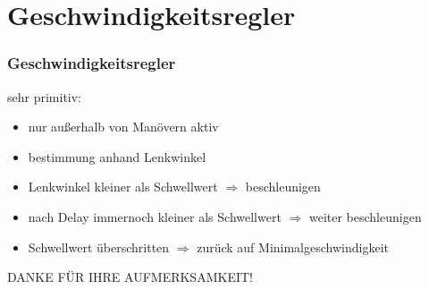 \documentclass{beamer}
\begin{document}
	\section{Geschwindigkeitsregler}
	
	\begin{frame}
	\frametitle{Geschwindigkeitsregler}
	sehr primitiv:
		\begin{itemize}
			\item nur außerhalb von Manövern aktiv
			\item bestimmung anhand Lenkwinkel
			\item Lenkwinkel kleiner als Schwellwert $\Rightarrow$ beschleunigen
			\item nach Delay immernoch kleiner als Schwellwert $\Rightarrow$ weiter beschleunigen
			\item Schwellwert überschritten $\Rightarrow$ zurück auf Minimalgeschwindigkeit
		\end{itemize}
	\end{frame}
	
	\begin{frame}
		\center
		DANKE FÜR IHRE AUFMERKSAMKEIT!
	\end{frame}
\end{document}
